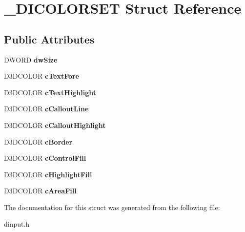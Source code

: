 \hypertarget{struct___d_i_c_o_l_o_r_s_e_t}{\section{\-\_\-\-D\-I\-C\-O\-L\-O\-R\-S\-E\-T Struct Reference}
\label{struct___d_i_c_o_l_o_r_s_e_t}
}
\subsection*{Public Attributes}
\begin{DoxyCompactItemize}
\item 
\hypertarget{struct___d_i_c_o_l_o_r_s_e_t_a0c65095ebfc4c3dfe28fbbc75a334746}{D\-W\-O\-R\-D {\bfseries dw\-Size}}\label{struct___d_i_c_o_l_o_r_s_e_t_a0c65095ebfc4c3dfe28fbbc75a334746}

\item 
\hypertarget{struct___d_i_c_o_l_o_r_s_e_t_a45b2b16eae6c72c231449b641e501573}{D3\-D\-C\-O\-L\-O\-R {\bfseries c\-Text\-Fore}}\label{struct___d_i_c_o_l_o_r_s_e_t_a45b2b16eae6c72c231449b641e501573}

\item 
\hypertarget{struct___d_i_c_o_l_o_r_s_e_t_af028b783928c3f8e77484c71ee497679}{D3\-D\-C\-O\-L\-O\-R {\bfseries c\-Text\-Highlight}}\label{struct___d_i_c_o_l_o_r_s_e_t_af028b783928c3f8e77484c71ee497679}

\item 
\hypertarget{struct___d_i_c_o_l_o_r_s_e_t_ab2d63d7735d09f095d7c8885839b1795}{D3\-D\-C\-O\-L\-O\-R {\bfseries c\-Callout\-Line}}\label{struct___d_i_c_o_l_o_r_s_e_t_ab2d63d7735d09f095d7c8885839b1795}

\item 
\hypertarget{struct___d_i_c_o_l_o_r_s_e_t_a7bdbde250594a90cf01383d5c44baf2b}{D3\-D\-C\-O\-L\-O\-R {\bfseries c\-Callout\-Highlight}}\label{struct___d_i_c_o_l_o_r_s_e_t_a7bdbde250594a90cf01383d5c44baf2b}

\item 
\hypertarget{struct___d_i_c_o_l_o_r_s_e_t_a7d4442c8926e9296f82890141358fab0}{D3\-D\-C\-O\-L\-O\-R {\bfseries c\-Border}}\label{struct___d_i_c_o_l_o_r_s_e_t_a7d4442c8926e9296f82890141358fab0}

\item 
\hypertarget{struct___d_i_c_o_l_o_r_s_e_t_ad15cd591b6bfd7c58a576ac12a7d3c6a}{D3\-D\-C\-O\-L\-O\-R {\bfseries c\-Control\-Fill}}\label{struct___d_i_c_o_l_o_r_s_e_t_ad15cd591b6bfd7c58a576ac12a7d3c6a}

\item 
\hypertarget{struct___d_i_c_o_l_o_r_s_e_t_a96b6b33787aea8245f0e31bccf06578e}{D3\-D\-C\-O\-L\-O\-R {\bfseries c\-Highlight\-Fill}}\label{struct___d_i_c_o_l_o_r_s_e_t_a96b6b33787aea8245f0e31bccf06578e}

\item 
\hypertarget{struct___d_i_c_o_l_o_r_s_e_t_a7e32f1f66d973e9f44f415266c2ebfd7}{D3\-D\-C\-O\-L\-O\-R {\bfseries c\-Area\-Fill}}\label{struct___d_i_c_o_l_o_r_s_e_t_a7e32f1f66d973e9f44f415266c2ebfd7}

\end{DoxyCompactItemize}


The documentation for this struct was generated from the following file\-:\begin{DoxyCompactItemize}
\item 
dinput.\-h\end{DoxyCompactItemize}
